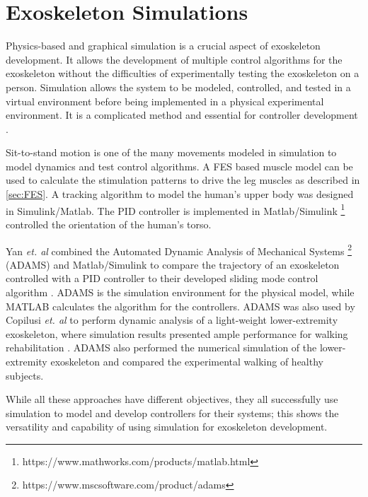 \section{Exoskeleton Simulations}
Physics-based and graphical simulation is a crucial aspect of exoskeleton development. It allows the development of multiple control algorithms for the exoskeleton without the difficulties of experimentally testing the exoskeleton on a person. Simulation allows the system to be modeled, controlled, and tested in a virtual environment before being implemented in a physical experimental environment. It is a complicated method and essential for controller development \cite{ZLAJPAH2008879}.   

Sit-to-stand motion is one of the many movements modeled in simulation to model dynamics and test control algorithms. A FES based muscle model can be used to calculate the stimulation patterns to drive the leg muscles as described in \autoref{sec:FES}.
A tracking algorithm to model the human's upper body was designed in Simulink/Matlab. The PID controller is implemented in Matlab/Simulink \footnote{https://www.mathworks.com/products/matlab.html} controlled the orientation of the human's torso. 

Yan \textit{et. al} combined the Automated Dynamic Analysis of Mechanical Systems \footnote{https://www.mscsoftware.com/product/adams} (ADAMS) and Matlab/Simulink to compare the trajectory of an exoskeleton controlled with a PID controller to their developed sliding mode control algorithm \cite{Yan_2017}. ADAMS is the simulation environment for the physical model, while MATLAB calculates the algorithm for the controllers. ADAMS was also used by Copilusi \textit{et. al} to perform dynamic analysis of a light-weight lower-extremity exoskeleton, where simulation results presented ample performance for walking rehabilitation  \cite{copilusi2014}. ADAMS also performed the numerical simulation \cite{geonea2017design} of the lower-extremity exoskeleton and compared the experimental walking of healthy subjects. 

While all these approaches have different objectives, they all successfully use simulation to model and develop controllers for their systems; this shows the versatility and capability of using simulation for exoskeleton development. 
